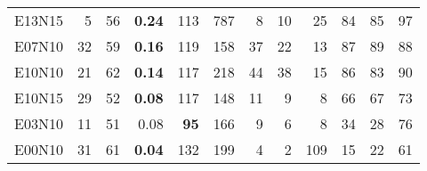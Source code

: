 \documentclass[ppgc,tese,english,formais,babel]{iiufrgs}
\newcommand{\bestcolumnemph}[1]{\textbf{#1}}
\begin{document}
\begin{table}
\begin{center}
\begin{tabular}{lrrrrrrrrrrr}
E13N15 & 5 & 56 & \bestcolumnemph{0.24} & 113 & 787 & 8 & 10 & 25 & 84 & 85 & 97 \\
E07N10 & 32 & 59 & \bestcolumnemph{0.16} & 119 & 158 & 37 & 22 & 13 & 87 & 89 & 88 \\
E10N10 & 21 & 62 & \bestcolumnemph{0.14} & 117 & 218 & 44 & 38 & 15 & 86 & 83 & 90 \\
E10N15 & 29 & 52 & \bestcolumnemph{0.08} & 117 & 148 & 11 & 9 & 8 & 66 & 67 & 73 \\
E03N10 & 11 & 51 & 0.08 & \bestcolumnemph{95} & 166 & 9 & 6 & 8 & 34 & 28 & 76 \\
E00N10 & 31 & 61 & \bestcolumnemph{0.04} & 132 & 199 & 4 & 2 & 109 & 15 & 22 & 61 \\\hline\hline
\end{tabular}
\end{center}
\end{table}

\begin{comment}
\begin{figure}[h]
    \caption{Time comparison between runs with distinct levels of hybridization.}
    \begin{center}
    \texttt{[image: plots/hyb\_box\_plot.pdf]}
    \end{center}
    \label{fig:hyb_bar_plot}
    \legend{Consider only the instances for which at least one run took at least 10 seconds. Source: the author.}
\end{figure}
\end{comment}
\end{document}
